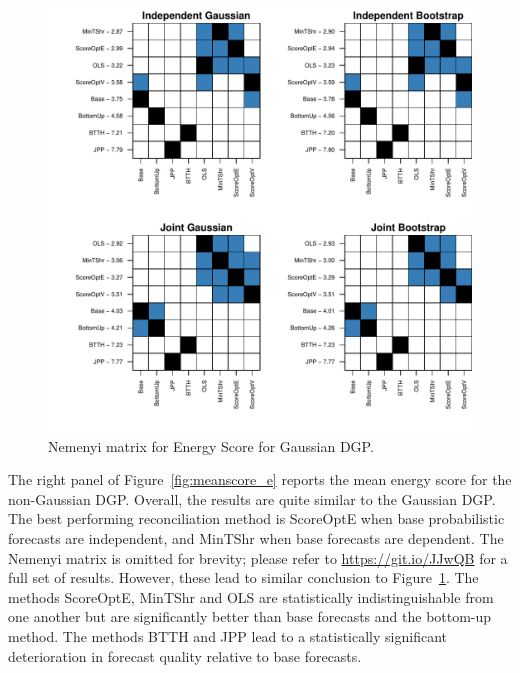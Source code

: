 \documentclass[a4paper,12pt]{article}
\theoremstyle{definition}
\begin{document}
\begin{figure}[!htb]
	\centering
	\includegraphics[height=.5\textheight]{Figs/gse.pdf}
	\caption{Nemenyi matrix for Energy Score for Gaussian DGP.}
	\label{fig:gse}
\end{figure}


The right panel of Figure~\ref{fig:meanscore_e} reports the mean energy score for the non-Gaussian DGP\@. Overall, the results are quite similar to the Gaussian DGP\@. The best performing reconciliation method is ScoreOptE when base probabilistic forecasts are independent, and MinTShr when base forecasts are dependent. The Nemenyi matrix is omitted for brevity; please refer to \url{https://git.io/JJwQB} for a full set of results. However, these lead to similar conclusion to Figure~\ref{fig:gse}. The methods ScoreOptE, MinTShr and OLS are statistically indistinguishable from one another but are significantly better than base forecasts and the bottom-up method. The methods BTTH and JPP lead to a statistically significant deterioration in forecast quality relative to base forecasts.
\end{document}
